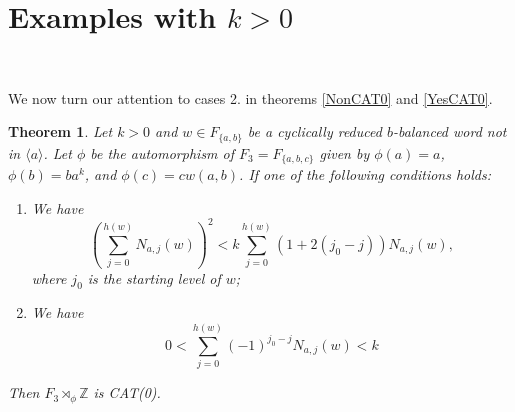 \documentclass  [a4paper, 11pts] {article}
\newtheorem{thm}{Theorem}[section]
\newcommand{\Z}{\mathbb{Z}}
\begin{document}
\section{Examples with $k>0$} ~
\label{NoF2}

We now turn our attention to cases 2. in theorems \ref{NonCAT0} and \ref{YesCAT0}.

\begin{thm}
\label{CAT0ex}
    Let $k > 0$ and $w\in F_{\{a, b\}}$ be a cyclically reduced $b$-balanced word not in $\langle a\rangle$. Let $\phi$ be the automorphism of $F_3=F_{\{a,b,c\}}$ given by $\phi(a)=a$, $\phi(b)=ba^k$, and $\phi(c) = cw(a,b)$. If one of the following conditions holds:
    \begin{enumerate}
        \item We have
        \[\left(\sum_{j=0}^{h(w)} N_{a,j}(w)\right)^2 < k\sum_{j=0}^{h(w)} (1 + 2(j_0-j))N_{a,j}(w),\]
        where $j_0$ is the starting level of $w$;
        \item We have
        \[0 < \sum_{j=0}^{h(w)} (-1)^{j_0-j}N_{a,j}(w) < k\]
    \end{enumerate}
    Then $F_3\rtimes_\phi\Z$ is CAT(0).
\end{thm}
\end{document}
